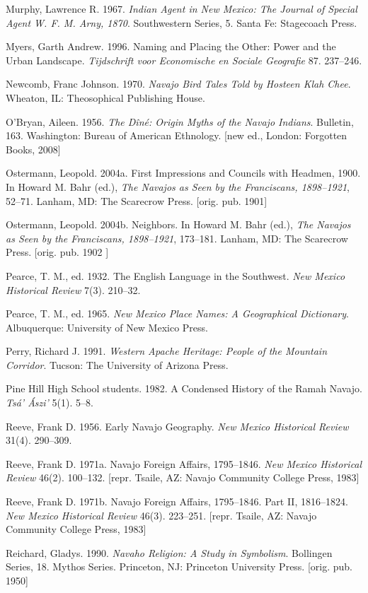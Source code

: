 \begin{hang}
	Murphy, Lawrence R.  1967. \textit{Indian Agent in New Mexico: The Journal of Special Agent W. F. M. Arny, 1870}.  Southwestern Series, 5.  Santa Fe:  Stagecoach Press.

	Myers, Garth Andrew. 1996.  Naming and Placing the Other: Power and the Urban Landscape.  \textit{Tijdschrift voor Economische en Sociale Geografie} 87. 237--246.

	Newcomb, Franc Johnson. 1970. \textit{Navajo Bird Tales Told by Hosteen Klah Chee}.  Wheaton, IL:  Theosophical Publishing House.

	O'Bryan, Aileen. 1956. \textit{The Dîné: Origin Myths of the Navajo Indians}.  Bulletin,  163.  Washington:  Bureau of American Ethnology.  [new ed., London:  Forgotten Books, 2008]

	Ostermann, Leopold. 2004a.  First Impressions and Councils with Headmen, 1900.  In Howard M. Bahr (ed.), \textit{The Navajos as Seen by the Franciscans, 1898--1921}, 52--71.  Lanham, MD:  The Scarecrow Press.  [orig. pub. 1901]


	Ostermann, Leopold. 2004b.  Neighbors. In Howard M. Bahr (ed.), \textit{The Navajos as Seen by the Franciscans, 1898--1921}, 173--181.  Lanham, MD:  The Scarecrow Press.  [orig. pub. 1902 ]

	Pearce, T. M., ed. 1932.  The English Language in the Southwest.  \textit{New Mexico Historical Review} 7(3). 210--32.

	Pearce, T. M., ed. 1965. \textit{New Mexico Place Names: A Geographical Dictionary}.  Albuquerque:  University of New Mexico Press.

	Perry, Richard J.  1991. \textit{Western Apache Heritage: People of the Mountain Corridor}.  Tucson:  The University of Arizona Press.

	Pine Hill High School students. 1982.  A Condensed History of the Ramah Navajo.  \textit{Tsá’ Ászi’} 5(1). 5--8.

	Reeve, Frank D.  1956.  Early Navajo Geography.  \textit{New Mexico Historical Review} 31(4). 290--309.

	Reeve, Frank D. 1971a.  Navajo Foreign Affairs, 1795--1846.   \textit{New Mexico Historical Review} 46(2). 100--132.  [repr. Tsaile, AZ:  Navajo Community College Press, 1983]

	Reeve, Frank D. 1971b.  Navajo Foreign Affairs, 1795--1846. Part II, 1816--1824.  \textit{New Mexico Historical Review} 46(3). 223--251.  [repr. Tsaile, AZ:  Navajo Community College Press, 1983]

	Reichard, Gladys. 1990. \textit{Navaho Religion: A Study in Symbolism}.  Bollingen Series, 18.  Mythos Series.  Princeton, NJ:  Princeton University Press.  [orig. pub. 1950]


\end{hang}
